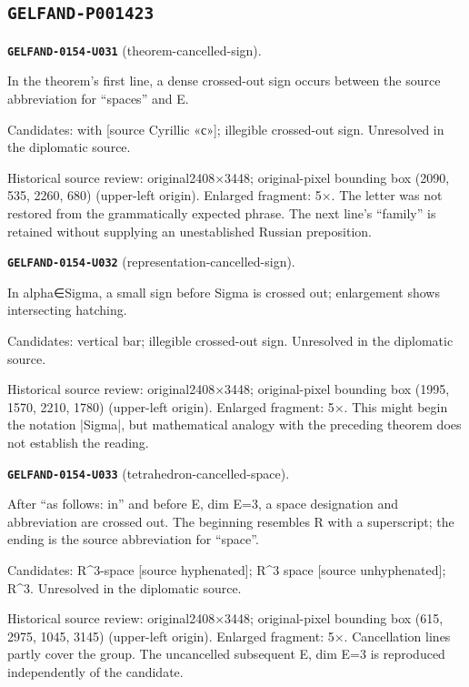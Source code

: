 \subsection*{\texttt{GELFAND-P001423}}
\par\noindent\leavevmode{}\label{GELFAND-0154-U031}\textbf{\texttt{GELFAND-0154-U031}} (theorem-cancelled-sign).\nopagebreak[4]\par
In the theorem’s first line, a dense crossed-out sign occurs between the source abbreviation for “spaces” and E.\par
Candidates: with [source Cyrillic «с»]; illegible crossed-out sign. Unresolved in the diplomatic source.\par
Historical source review: original2408×3448; original-pixel bounding box (2090, 535, 2260, 680) (upper-left origin). Enlarged fragment: 5×. The letter was not restored from the grammatically expected phrase. The next line’s “family” is retained without supplying an unestablished Russian preposition.\par\medskip
\par\noindent\leavevmode{}\label{GELFAND-0154-U032}\textbf{\texttt{GELFAND-0154-U032}} (representation-cancelled-sign).\nopagebreak[4]\par
In alpha∈Sigma, a small sign before Sigma is crossed out; enlargement shows intersecting hatching.\par
Candidates: vertical bar; illegible crossed-out sign. Unresolved in the diplomatic source.\par
Historical source review: original2408×3448; original-pixel bounding box (1995, 1570, 2210, 1780) (upper-left origin). Enlarged fragment: 5×. This might begin the notation |Sigma|, but mathematical analogy with the preceding theorem does not establish the reading.\par\medskip
\par\noindent\leavevmode{}\label{GELFAND-0154-U033}\textbf{\texttt{GELFAND-0154-U033}} (tetrahedron-cancelled-space).\nopagebreak[4]\par
After “as follows: in” and before E, dim E=3, a space designation and abbreviation are crossed out. The beginning resembles R with a superscript; the ending is the source abbreviation for “space”.\par
Candidates: R\textasciicircum{}3-space [source hyphenated]; R\textasciicircum{}3 space [source unhyphenated]; R\textasciicircum{}3. Unresolved in the diplomatic source.\par
Historical source review: original2408×3448; original-pixel bounding box (615, 2975, 1045, 3145) (upper-left origin). Enlarged fragment: 5×. Cancellation lines partly cover the group. The uncancelled subsequent E, dim E=3 is reproduced independently of the candidate.\par\medskip
